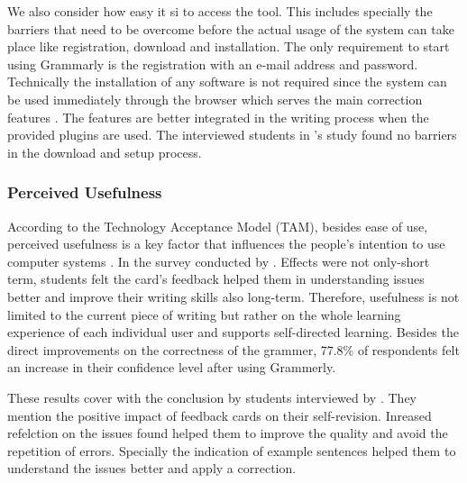 \documentclass[runningheads]{llncs}
\begin{document}
We also consider how easy it si to access the tool. This includes specially the barriers that need to be overcome before the actual usage of the system can take place like registration, download and installation. The only requirement to start using Grammarly is the registration with an e-mail address and password. Technically the installation of any software is not required since the system can be used immediately through the browser which serves the main correction features \citep{noauthor_write_nodate}. The features are better integrated in the writing process when the provided plugins are used. The interviewed students in \citeauthor{nova_utilizing_2018}'s study found no barriers in the download and setup process.

\subsubsection{Perceived Usefulness} 
According to the Technology Acceptance Model (TAM), besides ease of use, perceived usefulness is a key factor that influences the people's intention to use computer systems \citep{davis_user_1989}. In the survey conducted by \citeauthor{cavaleri_you_2016} . Effects were not only-short term, students felt the card's feedback helped them in understanding issues better and improve their writing skills also long-term. Therefore, usefulness is not limited to the current piece of writing but rather on the whole learning experience of each individual user and supports self-directed learning. Besides the direct improvements on the correctness of the grammer, 77.8\% of respondents felt an increase in their confidence level after using Grammerly. 

These results cover with the conclusion by students interviewed by \citep{nova_utilizing_2018}. They mention the positive impact of feedback cards on their self-revision. Inreased refelction on the issues found helped them to improve the quality and avoid the repetition of errors. Specially the indication of example sentences helped them to understand the issues better and apply a correction.
\end{document}
